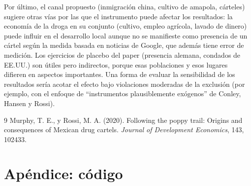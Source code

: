 \documentclass[11pt,a4paper]{article}
\begin{document}
Por último, el canal propuesto (inmigración china, cultivo de amapola, cárteles) sugiere otras vías por las que el instrumento puede afectar los resultados: la economía de la droga en su conjunto (cultivo, empleo agrícola, lavado de dinero) puede influir en el desarrollo local aunque no se manifieste como presencia de un cártel según la medida basada en noticias de Google, que además tiene error de medición. Los ejercicios de placebo del paper (presencia alemana, condados de EE.UU.) son útiles pero indirectos, porque esas poblaciones y esos lugares difieren en aspectos importantes. Una forma de evaluar la sensibilidad de los resultados sería acotar el efecto bajo violaciones moderadas de la exclusión (por ejemplo, con el enfoque de ``instrumentos plausiblemente exógenos'' de Conley, Hansen y Rossi).

\begin{thebibliography}{9}
 Murphy, T. E., y Rossi, M. A. (2020). Following the poppy trail: Origins and consequences of Mexican drug cartels. \textit{Journal of Development Economics}, 143, 102433.
\end{thebibliography}

\newpage
\appendix
\section*{Apéndice: código}

\end{document}
